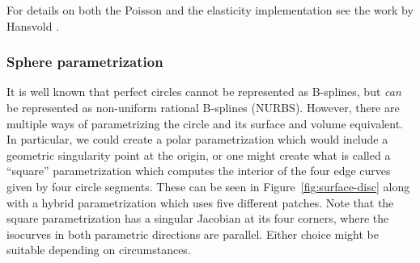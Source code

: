 \documentclass[preprint,12pt, a4paper]{elsarticle}
\begin{document}
For details on both the Poisson and the elasticity implementation see the work by Hansvold \cite{hansvold2015mgt}.

\subsubsection{Sphere parametrization}
\label{sec:sphere}

It is well known that perfect circles cannot be represented as B-splines, but \emph{can} be represented as non-uniform rational B-splines (NURBS).
However, there are multiple ways of parametrizing the circle and its surface and volume equivalent.
In particular, we could create a polar parametrization which would include a geometric singularity point at the origin, or one might create what is called a ``square'' parametrization which computes the interior of the four edge curves given by four circle segments.
These can be seen in Figure~\ref{fig:surface-disc} along with a hybrid parametrization which uses five different patches.
Note that the square parametrization has a singular Jacobian at its four corners, where the isocurves in both parametric directions are parallel.
Either choice might be suitable depending on circumstances.
\end{document}
